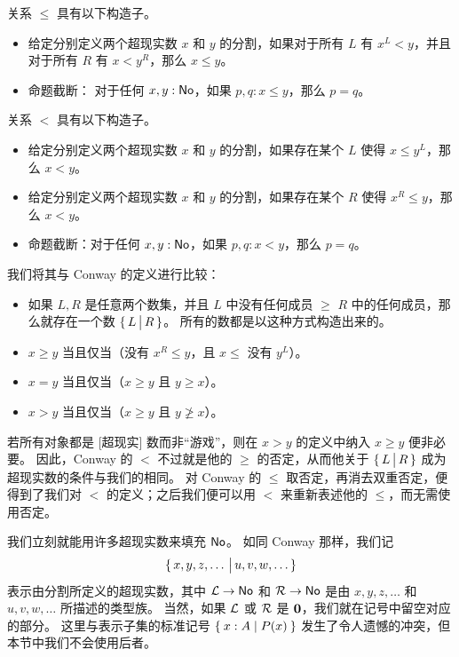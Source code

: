 \begin{defn}
  关系 $\le$ 具有以下构造子。
  \begin{itemize}
  \item 给定分别定义两个超现实数 $x$ 和 $y$ 的分割，如果对于所有 $L$ 有 $x^L<y$，并且对于所有 $R$ 有 $x<y^R$，那么 $x\le y$。
  \item 命题截断：
    对于任何 $x,y:\mathsf{No}$，如果 $p,q:x\le y$，那么 $p=q$。
  \end{itemize}
  关系 $<$ 具有以下构造子。
  \begin{itemize}
  \item 给定分别定义两个超现实数 $x$ 和 $y$ 的分割，如果存在某个 $L$ 使得 $x\le y^L$，那么 $x<y$。
  \item 给定分别定义两个超现实数 $x$ 和 $y$ 的分割，如果存在某个 $R$ 使得 $x^R\le y$，那么 $x<y$。
  \item 命题截断：对于任何 $x,y:\mathsf{No}$，如果 $p,q:x<y$，那么 $p=q$。
  \end{itemize}
\end{defn}

\noindent
我们将其与 Conway 的定义进行比较：

\begin{itemize}\footnotesize
\item[-] 如果 $L,R$ 是任意两个数集，并且 $L$ 中没有任何成员 $\ge$ $R$ 中的任何成员，那么就存在一个数 $\{\,L\,\big|\,R\,\}$。
  所有的数都是以这种方式构造出来的。
\item[-] $x\ge y$ 当且仅当（没有 $x^R\le y$，且 $x\le$ 没有 $y^L$）。
\item[-] $x=y$ 当且仅当（$x \ge y$ 且 $y\ge x$）。
\item[-] $x>y$ 当且仅当（$x\ge y$ 且 $y\not\ge x$）。
\end{itemize}


若所有对象都是 [超现实] 数而非``游戏''，则在 $x>y$ 的定义中纳入 $x\ge y$ 便非必要。
因此，Conway 的 $<$ 不过就是他的 $\ge$ 的否定，从而他关于 $\{\,L\,\big|\,R\,\}$ 成为超现实数的条件与我们的相同。
对 Conway 的 $\le$ 取否定，再消去双重否定，便得到了我们对 $<$ 的定义；之后我们便可以用 $<$ 来重新表述他的 $\le$，而无需使用否定。

我们立刻就能用许多超现实数来填充 $\mathsf{No}$。
如同 Conway 那样，我们记
\[\{\,x,y,z,\dots\,\big|\,u,v,w,\dots\,\}\]
表示由分割所定义的超现实数，其中 $\mathcal{L}\to\mathsf{No}$ 和 $\mathcal{R}\to\mathsf{No}$ 是由 $x,y,z,\dots$ 和 $u,v,w,\dots$ 所描述的类型族。
当然，如果 $\mathcal{L}$ 或 $\mathcal{R}$ 是 $\mathbf{0}$，我们就在记号中留空对应的部分。
这里与表示子集的标准记号 $\Set{x:A | P(x)}$ 发生了令人遗憾的冲突，但本节中我们不会使用后者。


